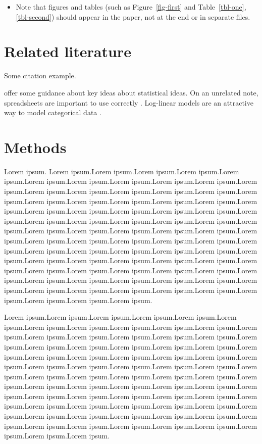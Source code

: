 \documentclass[
  11pt]{article}
\providecommand{\tightlist}{%
  \setlength{\itemsep}{0pt}\setlength{\parskip}{0pt}}\usepackage{longtable,booktabs,array}
\begin{document}
\begin{itemize}
\tightlist
\item
  Note that figures and tables (such as Figure~\ref{fig-first} and
  Table~\ref{tbl-one}, \ref{tbl-second}) should appear in the paper, not
  at the end or in separate files.
\end{itemize}

\section{Related literature}\label{sec-lit}

Some citation example.

\citet{gelm:veht:2021} offer some guidance about key ideas about
statistical ideas. On an unrelated note, spreadsheets are important to
use correctly \citep{brom:woo:2018}. Log-linear models are an attractive
way to model categorical data \citep{bish:fien:1975}.

\section{Methods}\label{sec-meth}

Lorem ipsum. Lorem ipsum.Lorem ipsum.Lorem ipsum.Lorem ipsum.Lorem
ipsum.Lorem ipsum.Lorem ipsum.Lorem ipsum.Lorem ipsum.Lorem ipsum.Lorem
ipsum.Lorem ipsum.Lorem ipsum.Lorem ipsum.Lorem ipsum.Lorem ipsum.Lorem
ipsum.Lorem ipsum.Lorem ipsum.Lorem ipsum.Lorem ipsum.Lorem ipsum.Lorem
ipsum.Lorem ipsum.Lorem ipsum.Lorem ipsum.Lorem ipsum.Lorem ipsum.Lorem
ipsum.Lorem ipsum.Lorem ipsum.Lorem ipsum.Lorem ipsum.Lorem ipsum.Lorem
ipsum.Lorem ipsum.Lorem ipsum.Lorem ipsum.Lorem ipsum.Lorem ipsum.Lorem
ipsum.Lorem ipsum.Lorem ipsum.Lorem ipsum.Lorem ipsum.Lorem ipsum.Lorem
ipsum.Lorem ipsum.Lorem ipsum.Lorem ipsum.Lorem ipsum.Lorem ipsum.Lorem
ipsum.Lorem ipsum.Lorem ipsum.Lorem ipsum.Lorem ipsum.Lorem ipsum.Lorem
ipsum.Lorem ipsum.Lorem ipsum.Lorem ipsum.Lorem ipsum.Lorem ipsum.Lorem
ipsum.Lorem ipsum.Lorem ipsum.Lorem ipsum.Lorem ipsum.Lorem ipsum.Lorem
ipsum.Lorem ipsum.Lorem ipsum.Lorem ipsum.Lorem ipsum.Lorem ipsum.Lorem
ipsum.Lorem ipsum.Lorem ipsum.Lorem ipsum.

Lorem ipsum.Lorem ipsum.Lorem ipsum.Lorem ipsum.Lorem ipsum.Lorem
ipsum.Lorem ipsum.Lorem ipsum.Lorem ipsum.Lorem ipsum.Lorem ipsum.Lorem
ipsum.Lorem ipsum.Lorem ipsum.Lorem ipsum.Lorem ipsum.Lorem ipsum.Lorem
ipsum.Lorem ipsum.Lorem ipsum.Lorem ipsum.Lorem ipsum.Lorem ipsum.Lorem
ipsum.Lorem ipsum.Lorem ipsum.Lorem ipsum.Lorem ipsum.Lorem ipsum.Lorem
ipsum.Lorem ipsum.Lorem ipsum.Lorem ipsum.Lorem ipsum.Lorem ipsum.Lorem
ipsum.Lorem ipsum.Lorem ipsum.Lorem ipsum.Lorem ipsum.Lorem ipsum.Lorem
ipsum.Lorem ipsum.Lorem ipsum.Lorem ipsum.Lorem ipsum.Lorem ipsum.Lorem
ipsum.Lorem ipsum.Lorem ipsum.Lorem ipsum.Lorem ipsum.Lorem ipsum.Lorem
ipsum.Lorem ipsum.Lorem ipsum.Lorem ipsum.Lorem ipsum.Lorem ipsum.Lorem
ipsum.Lorem ipsum.Lorem ipsum.Lorem ipsum.Lorem ipsum.Lorem ipsum.Lorem
ipsum.Lorem ipsum.Lorem ipsum.Lorem ipsum.Lorem ipsum.Lorem ipsum.Lorem
ipsum.Lorem ipsum.Lorem ipsum.
\end{document}
